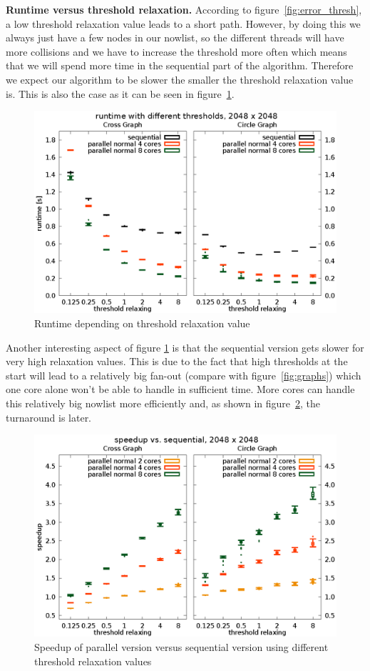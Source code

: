 \documentclass[letterpaper]{article}
\newcommand{\mypar}[1]{{\bf #1.}}
\begin{document}
\mypar{Runtime versus threshold relaxation}
According to figure~\ref{fig:error_thresh}, a low threshold relaxation value leads to a short path. However, by doing this we always just have a few nodes in our nowlist, so the different threads will have more collisions and we have to increase the threshold more often which means that we will spend more time in the sequential part of the algorithm. Therefore we expect our algorithm to be slower the smaller the threshold relaxation value is. This is also the case as it can be seen in figure~\ref{fig:runtime_thresh}.\\
\begin{figure}[h]\centering
  \includegraphics[scale=0.558]{runtime_threshold.eps}
  \caption{Runtime depending on threshold relaxation value\label{fig:runtime_thresh}}
\end{figure}
Another interesting aspect of figure \ref{fig:runtime_thresh} is that the sequential version gets slower for very high relaxation values. This is due to the fact that high thresholds at the start will lead to a relatively big fan-out (compare with figure~\ref{fig:graphs}) which one core alone won't be able to handle in sufficient time. More cores can handle this relatively big nowlist more efficiently and, as shown in figure~\ref{fig:speedup_thresh}, the turnaround is later.
\begin{figure}[h]\centering
  \includegraphics[scale=0.558]{speedup_threshold.eps}
  \caption{Speedup of parallel version versus sequential version using different threshold relaxation values\label{fig:speedup_thresh}}
\end{figure}
\end{document}
